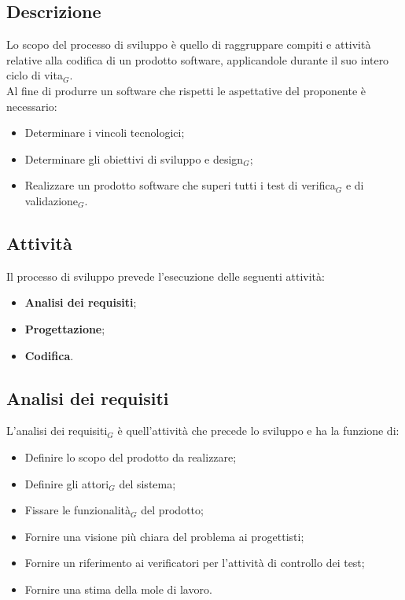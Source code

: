 \subsection{Descrizione}
  Lo scopo del processo di sviluppo è quello di raggruppare compiti e attività relative alla codifica di un prodotto software, applicandole durante il suo intero ciclo di vita$_G$. \\
  Al fine di produrre un software che rispetti le aspettative del proponente è necessario:
  \begin{itemize}
    \item Determinare i vincoli tecnologici;
    \item Determinare gli obiettivi di sviluppo e design$_G$;
    \item Realizzare un prodotto software che superi tutti i test di verifica$_G$ e di validazione$_G$.
  \end{itemize}
  \subsection{Attività}

  Il processo di sviluppo prevede l'esecuzione delle seguenti attività:
  \begin{itemize}
    \item \textbf{Analisi dei requisiti};
    \item \textbf{Progettazione};
    \item \textbf{Codifica}.
  \end{itemize}
  \subsection{Analisi dei requisiti}
    L'analisi dei requisiti$_G$ è quell'attività che precede lo sviluppo e ha la funzione di:
    \begin{itemize}
      \item Definire lo scopo del prodotto da realizzare;
      \item Definire gli attori$_G$ del sistema;
      \item Fissare le funzionalità$_G$ del prodotto;
      \item Fornire una visione più chiara del problema ai progettisti;
      \item Fornire un riferimento ai verificatori per l'attività di controllo dei test;
      \item Fornire una stima della mole di lavoro.
    \end{itemize}
